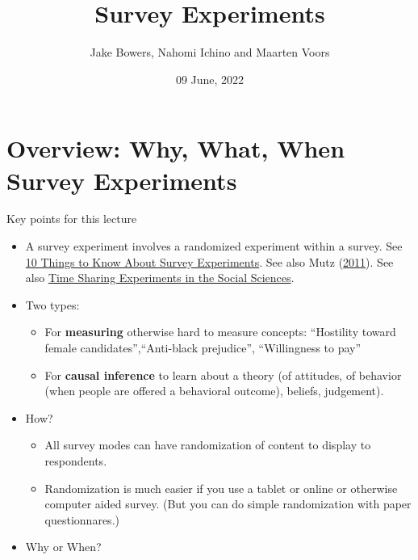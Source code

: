 \documentclass[
  ignorenonframetext,
]{beamer}
\title{Survey Experiments}
\author{Jake Bowers, Nahomi Ichino and Maarten Voors}
\date{09 June, 2022}
\providecommand{\tightlist}{%
  \setlength{\itemsep}{0pt}\setlength{\parskip}{0pt}}
\begin{document}
\frame{\titlepage}

\begin{frame}[allowframebreaks]
  \tableofcontents[hideallsubsections]
\end{frame}
\hypertarget{overview-why-what-when-survey-experiments}{%
\section{Overview: Why, What, When Survey
Experiments}\label{overview-why-what-when-survey-experiments}}

\begin{frame}[allowframebreaks]{Key points for this lecture}
\protect\hypertarget{key-points-for-this-lecture}{}
\begin{itemize}
\item
  A survey experiment involves a randomized experiment within a survey.
  See
  \href{https://egap.org/resource/10-things-to-know-about-survey-experiments/}{10
  Things to Know About Survey Experiments}. See also Mutz
  (\protect\hyperlink{ref-mutz2011population}{2011}). See also
  \href{https://www.tessexperiments.org}{Time Sharing Experiments in the
  Social Sciences}.
\item
  Two types:

  \begin{itemize}
  \tightlist
  \item
    For \textbf{measuring} otherwise hard to measure concepts:
    ``Hostility toward female candidates'',``Anti-black prejudice'',
    ``Willingness to pay''
  \item
    For \textbf{causal inference} to learn about a theory (of attitudes,
    of behavior (when people are offered a behavioral outcome), beliefs,
    judgement).
  \end{itemize}
\item
  How?

  \begin{itemize}
  \tightlist
  \item
    All survey modes can have randomization of content to display to
    respondents.
  \item
    Randomization is much easier if you use a tablet or online or
    otherwise computer aided survey. (But you can do simple
    randomization with paper questionnares.)
  \end{itemize}
\item
  Why or When?


\end{itemize}
\end{frame}
\end{document}
